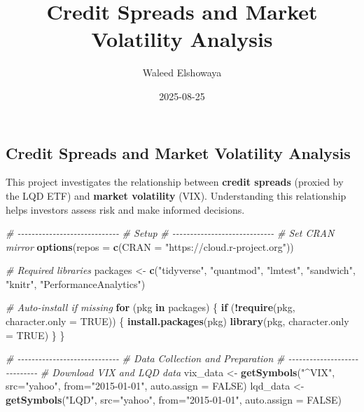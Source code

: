 \documentclass[
]{article}
\title{Credit Spreads and Market Volatility Analysis}
\author{Waleed Elshowaya}
\date{2025-08-25}
\newenvironment{Shaded}{\begin{snugshade}}{\end{snugshade}}
\newcommand{\AttributeTok}[1]{\textcolor[rgb]{0.13,0.29,0.53}{#1}}
\newcommand{\CommentTok}[1]{\textcolor[rgb]{0.56,0.35,0.01}{\textit{#1}}}
\newcommand{\ConstantTok}[1]{\textcolor[rgb]{0.56,0.35,0.01}{#1}}
\newcommand{\ControlFlowTok}[1]{\textcolor[rgb]{0.13,0.29,0.53}{\textbf{#1}}}
\newcommand{\FunctionTok}[1]{\textcolor[rgb]{0.13,0.29,0.53}{\textbf{#1}}}
\newcommand{\NormalTok}[1]{#1}
\newcommand{\OtherTok}[1]{\textcolor[rgb]{0.56,0.35,0.01}{#1}}
\newcommand{\SpecialCharTok}[1]{\textcolor[rgb]{0.81,0.36,0.00}{\textbf{#1}}}
\newcommand{\StringTok}[1]{\textcolor[rgb]{0.31,0.60,0.02}{#1}}
\begin{document}
\maketitle

\subsection{Credit Spreads and Market Volatility
Analysis}\label{credit-spreads-and-market-volatility-analysis}

This project investigates the relationship between \textbf{credit
spreads} (proxied by the LQD ETF) and \textbf{market volatility} (VIX).
Understanding this relationship helps investors assess risk and make
informed decisions.

\begin{Shaded}
\begin{Highlighting}[]
\CommentTok{\# {-}{-}{-}{-}{-}{-}{-}{-}{-}{-}{-}{-}{-}{-}{-}{-}{-}{-}{-}{-}{-}{-}{-}{-}{-}{-}{-}{-}{-}}
\CommentTok{\# Setup}
\CommentTok{\# {-}{-}{-}{-}{-}{-}{-}{-}{-}{-}{-}{-}{-}{-}{-}{-}{-}{-}{-}{-}{-}{-}{-}{-}{-}{-}{-}{-}{-}}
\CommentTok{\# Set CRAN mirror}
\FunctionTok{options}\NormalTok{(}\AttributeTok{repos =} \FunctionTok{c}\NormalTok{(}\AttributeTok{CRAN =} \StringTok{"https://cloud.r{-}project.org"}\NormalTok{))}

\CommentTok{\# Required libraries}
\NormalTok{packages }\OtherTok{\textless{}{-}} \FunctionTok{c}\NormalTok{(}\StringTok{"tidyverse"}\NormalTok{, }\StringTok{"quantmod"}\NormalTok{, }\StringTok{"lmtest"}\NormalTok{, }\StringTok{"sandwich"}\NormalTok{, }\StringTok{"knitr"}\NormalTok{, }\StringTok{"PerformanceAnalytics"}\NormalTok{)}

\CommentTok{\# Auto{-}install if missing}
\ControlFlowTok{for}\NormalTok{ (pkg }\ControlFlowTok{in}\NormalTok{ packages) \{}
  \ControlFlowTok{if}\NormalTok{ (}\SpecialCharTok{!}\FunctionTok{require}\NormalTok{(pkg, }\AttributeTok{character.only =} \ConstantTok{TRUE}\NormalTok{)) \{}
    \FunctionTok{install.packages}\NormalTok{(pkg)}
    \FunctionTok{library}\NormalTok{(pkg, }\AttributeTok{character.only =} \ConstantTok{TRUE}\NormalTok{)}
\NormalTok{  \}}
\NormalTok{\}}

\CommentTok{\# {-}{-}{-}{-}{-}{-}{-}{-}{-}{-}{-}{-}{-}{-}{-}{-}{-}{-}{-}{-}{-}{-}{-}{-}{-}{-}{-}{-}{-}}
\CommentTok{\# Data Collection and Preparation}
\CommentTok{\# {-}{-}{-}{-}{-}{-}{-}{-}{-}{-}{-}{-}{-}{-}{-}{-}{-}{-}{-}{-}{-}{-}{-}{-}{-}{-}{-}{-}{-}}
\CommentTok{\# Download VIX and LQD data}
\NormalTok{vix\_data }\OtherTok{\textless{}{-}} \FunctionTok{getSymbols}\NormalTok{(}\StringTok{"\^{}VIX"}\NormalTok{, }\AttributeTok{src=}\StringTok{"yahoo"}\NormalTok{, }\AttributeTok{from=}\StringTok{"2015{-}01{-}01"}\NormalTok{, }\AttributeTok{auto.assign =} \ConstantTok{FALSE}\NormalTok{)}
\NormalTok{lqd\_data }\OtherTok{\textless{}{-}} \FunctionTok{getSymbols}\NormalTok{(}\StringTok{"LQD"}\NormalTok{, }\AttributeTok{src=}\StringTok{"yahoo"}\NormalTok{, }\AttributeTok{from=}\StringTok{"2015{-}01{-}01"}\NormalTok{, }\AttributeTok{auto.assign =} \ConstantTok{FALSE}\NormalTok{)}


\end{Highlighting}
\end{Shaded}
\end{document}
